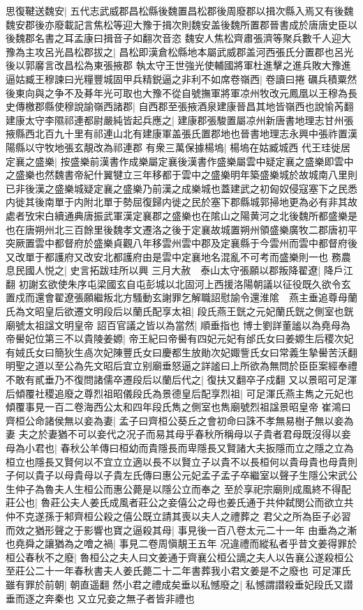 思復鞬送魏安|{
	五代志武威郡昌松縣後魏置昌松郡後周廢郡以揖次縣入焉又有後魏魏安郡後亦廢載記言焦松等迎大豫于揖次則魏安盖後魏所置郡晉書成於唐唐史臣以後魏郡名書之耳孟康曰揖音子如翻次音恣}
魏安人焦松齊肅張濟等聚兵數千人迎大豫為主攻呂光昌松郡拔之|{
	昌松即漢倉松縣地本屬武威郡盖河西張氏分置郡也呂光後以郭黁言改昌松為東張掖郡}
執太守王世強光使輔國將軍杜進擊之進兵敗大豫進逼姑臧王穆諫曰光糧豐城固甲兵精鋭逼之非利不如席卷嶺西|{
	卷讀曰捲}
礪兵積粟然後東向與之争不及朞年光可取也大豫不從自號撫軍將軍凉州牧改元鳳凰以王穆為長史傳檄郡縣使穆說諭嶺西諸郡|{
	自西郡至張掖酒泉建康晉昌其地皆嶺西也說愉芮翻}
建康太守李隰祁連都尉嚴純皆起兵應之|{
	建康郡張駿置屬凉州新唐書地理志甘州張掖縣西北百九十里有祁連山北有建康軍盖張氏置郡地也晉書地理志永興中張祚置漢陽縣以守牧地張玄靚改為祁連郡}
有衆三萬保據楊塢|{
	楊塢在姑臧城西}
代王珪徙居定襄之盛樂|{
	按盛樂前漢書作成樂屬定襄後漢書作盛樂屬雲中疑定襄之盛樂即雲中之盛樂也然魏書帝紀什翼犍立三年移都于雲中之盛樂明年築盛樂城於故城南八里則已非後漢之盛樂城疑定襄之盛樂乃前漢之成樂城也蓋建武之初匈奴侵寇塞下之民悉内徙其後南單于内附北單于勢屈復歸内徙之民於塞下郡縣城郭掃地更為必有非其故處者攷宋白續通典唐振武軍漢定襄郡之盛樂也在隂山之陽黄河之北後魏所都盛樂是也在唐朔州北三百餘里後魏孝文遷洛之後于定襄故城置朔州領盛樂廣牧二郡唐初平突厥置雲中都督府於盛樂貞觀八年移雲州雲中郡及定襄縣于今雲州而雲中都督府後又改單于都護府又改安北都護府由是雲中定襄地名混亂不可考而盛樂則一也}
務農息民國人悦之|{
	史言拓跋珪所以興}
三月大赦　泰山太守張願以郡叛降翟遼|{
	降戶江翻}
初謝玄欲使朱序屯梁國玄自屯彭城以北固河上西援洛陽朝議以征役既久欲令玄置戍而還會翟遼張願繼叛北方騷動玄謝罪乞解職詔慰諭令還淮隂　燕主垂追尊母蘭氏為文昭皇后欲遷文明段后以蘭氏配享太祖|{
	段氏燕王皝之元妃蘭氏皝之側室也皝廟號太祖諡文明皇帝}
詔百官議之皆以為當然|{
	順垂指也}
博士劉詳董謐以為堯母為帝嚳妃位第三不以貴陵姜嫄|{
	帝王紀曰帝嚳有四妃元妃有邰氏女曰姜嫄生后稷次妃有娀氏女曰簡狄生卨次妃陳豐氏女曰慶都生放勛次妃娵訾氏女曰常義生摯嚳苦沃翻}
明聖之道以至公為先文昭后宜立别廟垂怒逼之詳謐曰上所欲為無問於臣臣案經奉禮不敢有貳垂乃不復問諸儒卒遷段后以蘭后代之|{
	復扶又翻卒子戍翻}
又以景昭可足渾后傾覆社稷追廢之尊烈祖昭儀段氏為景德皇后配享烈祖|{
	可足渾氏燕主雋之元妃也傾覆事見一百二卷海西公太和四年段氏雋之側室也雋廟號烈祖諡景昭皇帝}
崔鴻曰齊桓公命諸侯無以妾為妻|{
	孟子曰齊桓公葵丘之會初命曰誅不孝無易樹子無以妾為妻}
夫之於妻猶不可以妾代之况子而易其母乎春秋所稱母以子貴者君母既沒得以妾母為小君也|{
	春秋公羊傳曰桓幼而貴隱長而卑隱長又賢諸大夫扳隱而立之隱之立為桓立也隱長又賢何以不宜立立適以長不以賢立子以貴不以長桓何以貴母貴也母貴則子何以貴子以母貴母以子貴左氏傳曰惠公元妃孟子孟子卒繼室以聲子生隱公宋武公生仲子為魯夫人生桓公而惠公薨是以隱公立而奉之}
至於享祀宗廟則成風終不得配莊公也|{
	魯莊公夫人姜氏成風者莊公之妾僖公之母也姜氏通于共仲弑閔公而欲立共仲不克遂孫于邾齊桓公殺之僖公既立請其喪以夫人之禮葬之}
君父之所為臣子必習而效之猶形聲之于影響也寶之逼殺其母|{
	事見後一百八卷太元二十一年}
由垂為之漸也堯舜之讓猶為之噲之禍|{
	事見二卷周愼靚王五年}
况違禮而縱私者乎昔文姜得罪於桓公春秋不之廢|{
	魯桓公之夫人曰文姜通于齊襄公桓公謫之夫人以告襄公遂殺桓公至莊公二十一年春秋書夫人姜氏薨二十二年書葬我小君文姜是不之廢也}
可足渾氏雖有罪於前朝|{
	朝直遥翻}
然小君之禮成矣垂以私憾廢之|{
	私憾謂譛殺垂妃段氏又譛垂而逐之奔秦也}
又立兄妾之無子者皆非禮也


